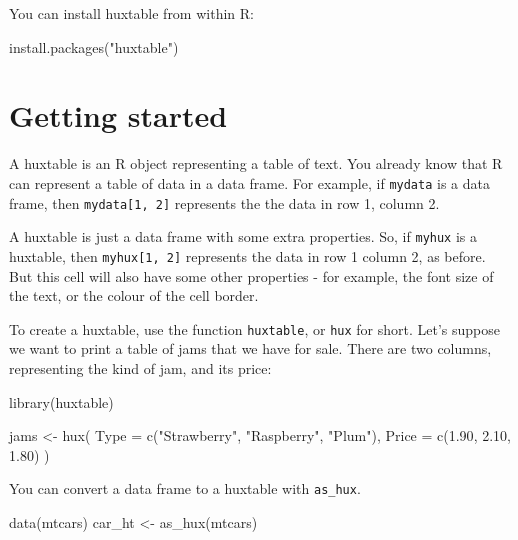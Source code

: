 \documentclass[
]{article}
\newenvironment{Shaded}{\begin{snugshade}}{\end{snugshade}}
\newcommand{\AttributeTok}[1]{\textcolor[rgb]{0.77,0.63,0.00}{#1}}
\newcommand{\FloatTok}[1]{\textcolor[rgb]{0.00,0.00,0.81}{#1}}
\newcommand{\FunctionTok}[1]{\textcolor[rgb]{0.00,0.00,0.00}{#1}}
\newcommand{\NormalTok}[1]{#1}
\newcommand{\OtherTok}[1]{\textcolor[rgb]{0.56,0.35,0.01}{#1}}
\newcommand{\StringTok}[1]{\textcolor[rgb]{0.31,0.60,0.02}{#1}}
\begin{document}
You can install huxtable from within R:

\begin{Shaded}
\begin{Highlighting}[]
\FunctionTok{install.packages}\NormalTok{(}\StringTok{"huxtable"}\NormalTok{)}
\end{Highlighting}
\end{Shaded}

\FloatBarrier

\hypertarget{getting-started}{%
\section{Getting started}\label{getting-started}}

A huxtable is an R object representing a table of text. You already know
that R can represent a table of data in a data frame. For example, if
\texttt{mydata} is a data frame, then \texttt{mydata{[}1,\ 2{]}}
represents the the data in row 1, column 2.

A huxtable is just a data frame with some extra properties. So, if
\texttt{myhux} is a huxtable, then \texttt{myhux{[}1,\ 2{]}} represents
the data in row 1 column 2, as before. But this cell will also have some
other properties - for example, the font size of the text, or the colour
of the cell border.

To create a huxtable, use the function \texttt{huxtable}, or
\texttt{hux} for short. Let's suppose we want to print a table of jams
that we have for sale. There are two columns, representing the kind of
jam, and its price:

\begin{Shaded}
\begin{Highlighting}[]
\FunctionTok{library}\NormalTok{(huxtable)}
 
\NormalTok{jams }\OtherTok{\textless{}{-}} \FunctionTok{hux}\NormalTok{(}
        \AttributeTok{Type  =} \FunctionTok{c}\NormalTok{(}\StringTok{"Strawberry"}\NormalTok{, }\StringTok{"Raspberry"}\NormalTok{, }\StringTok{"Plum"}\NormalTok{),}
        \AttributeTok{Price =} \FunctionTok{c}\NormalTok{(}\FloatTok{1.90}\NormalTok{, }\FloatTok{2.10}\NormalTok{, }\FloatTok{1.80}\NormalTok{)}
\NormalTok{      )}
\end{Highlighting}
\end{Shaded}

\FloatBarrier

You can convert a data frame to a huxtable with \texttt{as\_hux}.

\begin{Shaded}
\begin{Highlighting}[]
\FunctionTok{data}\NormalTok{(mtcars)}
\NormalTok{car\_ht }\OtherTok{\textless{}{-}} \FunctionTok{as\_hux}\NormalTok{(mtcars)}
\end{Highlighting}
\end{Shaded}
\end{document}
